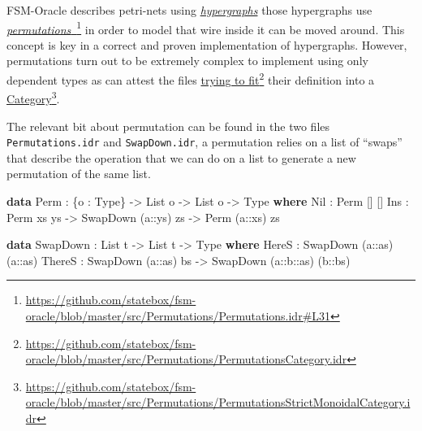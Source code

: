 \documentclass[
]{article}
\newenvironment{Shaded}{}{}
\newcommand{\DataTypeTok}[1]{\textcolor[rgb]{0.56,0.13,0.00}{#1}}
\newcommand{\KeywordTok}[1]{\textcolor[rgb]{0.00,0.44,0.13}{\textbf{#1}}}
\newcommand{\NormalTok}[1]{#1}
\newcommand{\OperatorTok}[1]{\textcolor[rgb]{0.40,0.40,0.40}{#1}}
\newcommand{\OtherTok}[1]{\textcolor[rgb]{0.00,0.44,0.13}{#1}}
\begin{document}
FSM-Oracle describes petri-nets using
\href{http://www.zanasi.com/fabio/files/paperCALCO19b.pdf}{\emph{hypergraphs}}
\cite{cartographer} those hypergraphs use
\href{https://github.com/statebox/fsm-oracle/blob/master/src/Permutations/Permutations.idr\#L31}{\emph{permutations}~}\footnote{\url{https://github.com/statebox/fsm-oracle/blob/master/src/Permutations/Permutations.idr\#L31}}
in order to model that wire inside it can be moved around. This concept
is key in a correct and proven implementation of hypergraphs. However,
permutations turn out to be extremely complex to implement using only
dependent types as can attest the files
\href{https://github.com/statebox/fsm-oracle/blob/master/src/Permutations/PermutationsCategory.idr}{trying
to fit}\footnote{\url{https://github.com/statebox/fsm-oracle/blob/master/src/Permutations/PermutationsCategory.idr}}
their definition into a
\href{https://github.com/statebox/fsm-oracle/blob/master/src/Permutations/PermutationsStrictMonoidalCategory.idr}{Category}\footnote{\url{https://github.com/statebox/fsm-oracle/blob/master/src/Permutations/PermutationsStrictMonoidalCategory.idr}}.

The relevant bit about permutation can be found in the two files
\texttt{Permutations.idr} and \texttt{SwapDown.idr}, a permutation
relies on a list of ``swaps'' that describe the operation that we can do
on a list to generate a new permutation of the same list.

\begin{Shaded}
\begin{Highlighting}[]
\KeywordTok{data} \DataTypeTok{Perm} \OperatorTok{:}\NormalTok{ \{o }\OperatorTok{:} \DataTypeTok{Type}\NormalTok{\} }\OtherTok{{-}\textgreater{}} \DataTypeTok{List}\NormalTok{ o }\OtherTok{{-}\textgreater{}} \DataTypeTok{List}\NormalTok{ o }\OtherTok{{-}\textgreater{}} \DataTypeTok{Type} \KeywordTok{where}
  \DataTypeTok{Nil} \OperatorTok{:} \DataTypeTok{Perm}\NormalTok{ [] []}
  \DataTypeTok{Ins} \OperatorTok{:} \DataTypeTok{Perm}\NormalTok{ xs ys }\OtherTok{{-}\textgreater{}} \DataTypeTok{SwapDown}\NormalTok{ (}\OtherTok{a::}\NormalTok{ys) zs }\OtherTok{{-}\textgreater{}} \DataTypeTok{Perm}\NormalTok{ (}\OtherTok{a::}\NormalTok{xs) zs}

\KeywordTok{data} \DataTypeTok{SwapDown} \OperatorTok{:} \DataTypeTok{List}\NormalTok{ t }\OtherTok{{-}\textgreater{}} \DataTypeTok{List}\NormalTok{ t }\OtherTok{{-}\textgreater{}} \DataTypeTok{Type} \KeywordTok{where}
  \DataTypeTok{HereS}  \OperatorTok{:} \DataTypeTok{SwapDown}\NormalTok{ (}\OtherTok{a::}\NormalTok{as) (}\OtherTok{a::}\NormalTok{as)}
  \DataTypeTok{ThereS} \OperatorTok{:} \DataTypeTok{SwapDown}\NormalTok{ (}\OtherTok{a::}\NormalTok{as) bs }\OtherTok{{-}\textgreater{}} \DataTypeTok{SwapDown}\NormalTok{ (}\OtherTok{a::b::}\NormalTok{as) (}\OtherTok{b::}\NormalTok{bs)}
\end{Highlighting}
\end{Shaded}
\end{document}
